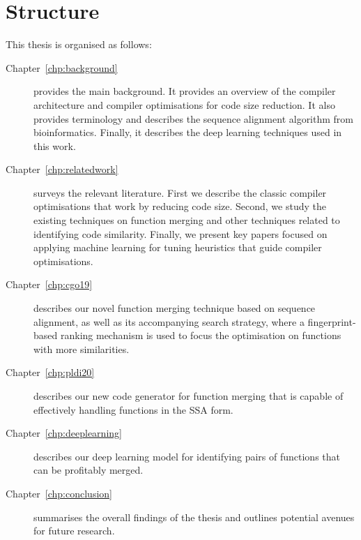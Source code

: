 \section{Structure}

This thesis is organised as follows:
\begin{description}

\item[Chapter~\ref{chp:background}] provides the main background. It provides an overview of the compiler architecture and compiler optimisations for code size reduction.
It also provides terminology and describes the sequence alignment algorithm from bioinformatics.
Finally, it describes the deep learning techniques used in this work.

\item[Chapter~\ref{chp:relatedwork}] surveys the relevant literature. First we describe the classic compiler optimisations that work by reducing code size. Second, we study the existing techniques on function merging and other techniques related to identifying code similarity. Finally, we present key papers focused on applying machine learning for tuning heuristics that guide compiler optimisations.

\item[Chapter~\ref{chp:cgo19}] describes our novel function merging technique based on sequence alignment, as well as its accompanying search strategy, where a fingerprint-based ranking mechanism is used to focus the optimisation on functions with more similarities. %

\item[Chapter~\ref{chp:pldi20}] describes our new code generator for function merging that is capable of effectively handling functions in the SSA form.

\item[Chapter~\ref{chp:deeplearning}] describes our deep learning model for identifying pairs of functions that can be profitably merged.

\item[Chapter~\ref{chp:conclusion}] summarises the overall findings of the thesis and outlines potential avenues for future research.

\end{description}
